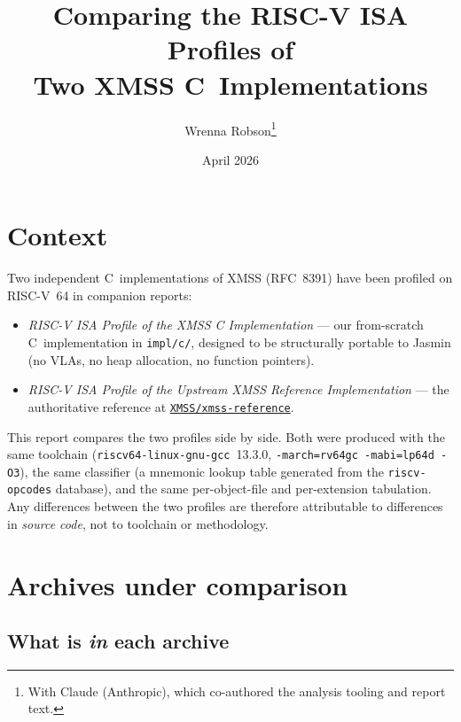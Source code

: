 \documentclass[11pt,a4paper]{article}
\title{Comparing the RISC-V ISA Profiles of\\
  Two XMSS C~Implementations}
\author{Wrenna Robson\thanks{With Claude (Anthropic), which co-authored
  the analysis tooling and report text.}}
\date{April 2026}
\begin{document}
\maketitle

\section{Context}

Two independent C~implementations of XMSS (RFC~8391) have been
profiled on RISC-V~64 in companion reports:

\begin{itemize}[nosep]
  \item \emph{RISC-V ISA Profile of the XMSS C Implementation} --- our
    from-scratch C~implementation in \texttt{impl/c/}, designed to be
    structurally portable to Jasmin (no VLAs, no heap allocation, no
    function pointers).
  \item \emph{RISC-V ISA Profile of the Upstream XMSS Reference
    Implementation} --- the authoritative reference at
    \href{https://github.com/XMSS/xmss-reference}{\texttt{XMSS/xmss-reference}}.
\end{itemize}

This report compares the two profiles side by side.  Both were produced
with the same toolchain (\texttt{riscv64-linux-gnu-gcc}~13.3.0,
\texttt{-march=rv64gc -mabi=lp64d -O3}), the same classifier (a
mnemonic lookup table generated from the \texttt{riscv-opcodes}
database), and the same per-object-file and per-extension tabulation.
Any differences between the two profiles are therefore attributable
to differences in \emph{source code}, not to toolchain or methodology.

\section{Archives under comparison}

\subsection{What is \emph{in} each archive}
\end{document}
